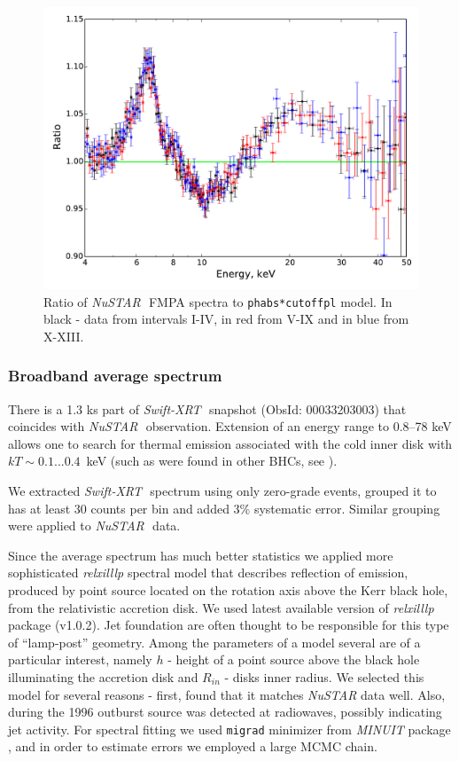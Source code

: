 \documentclass[a4paper,fleqn,usenatbib]{mnras}
\def\swiftx{{\em Swift-XRT\,}}
\def\nustar{{\em NuSTAR\,}}
\begin{document}
\begin{figure}
\centerline{\includegraphics[width=\linewidth]{ratios_v01.pdf}}
\caption{Ratio of \nustar\, FMPA spectra to \texttt{phabs*cutoffpl} model. In black - data from intervals I-IV, in red from V-IX and in blue from X-XIII.} 
\label{fig:ratios}
\end{figure}  

            
\subsubsection{Broadband average spectrum}
\label{sec:spec}            
There is a 1.3 ks part of \swiftx\, snapshot (ObsId: 00033203003) that coincides with \nustar\, observation. 
Extension of an energy range to 0.8--78 keV allows one to search for thermal emission associated with the cold inner disk with $kT \sim 0.1...0.4$~keV (such as were found in other BHCs, see \cite[][ e.t.c]{miller06b,miller06a,parker15}).

We extracted \swiftx\, spectrum using only zero-grade events, grouped it to has at least 30 counts per bin and added 3\% systematic error. 
Similar grouping were applied to \nustar\, data. 

Since the average spectrum has much better statistics we applied more sophisticated {\it relxilllp} spectral model that describes reflection of emission, produced by point source located on the rotation axis above the Kerr black hole, from the relativistic accretion disk. 
We used latest available version of {\it relxilllp} package (v1.0.2).
Jet foundation are often thought to be responsible for this type of ``lamp-post'' geometry. 
Among the parameters of a model several are of a particular interest, namely $h$ - height of a point source above the black hole illuminating the accretion disk and $R_{in}$ - disks inner radius.  
We selected this model for several reasons - first, \cite{miller15_nust} found that it matches {\it NuSTAR} data well. 
Also, during the 1996 outburst source was detected at radiowaves, possibly indicating jet activity. 
For spectral fitting we used \texttt{migrad} minimizer from {\em MINUIT} package \citep{james75minuit}, and in order to estimate errors we employed a large MCMC chain. 
\end{document}
